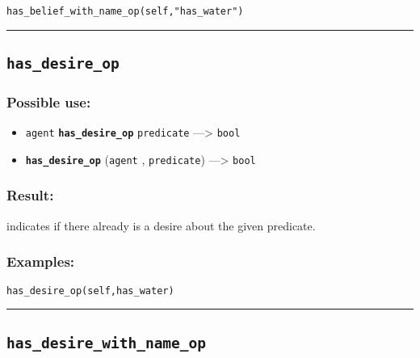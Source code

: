\documentclass[]{book}
\providecommand{\tightlist}{%
  \setlength{\itemsep}{0pt}\setlength{\parskip}{0pt}}
\theoremstyle{definition}
\theoremstyle{definition}
\theoremstyle{definition}
\theoremstyle{remark}
\begin{document}
\begin{verbatim}
has_belief_with_name_op(self,"has_water") 
\end{verbatim}

\begin{center}\rule{0.5\linewidth}{\linethickness}\end{center}

\subsection{\texorpdfstring{\texttt{has\_desire\_op}}{has\_desire\_op}}\label{has_desire_op}

\subsubsection{Possible use:}\label{possible-use-248}

\begin{itemize}
\tightlist
\item
  \texttt{agent} \textbf{\texttt{has\_desire\_op}} \texttt{predicate}
  ---\textgreater{} \texttt{bool}
\item
  \textbf{\texttt{has\_desire\_op}} (\texttt{agent} ,
  \texttt{predicate}) ---\textgreater{} \texttt{bool}
\end{itemize}

\subsubsection{Result:}\label{result-239}

indicates if there already is a desire about the given predicate.

\subsubsection{Examples:}\label{examples-188}

\begin{verbatim}
has_desire_op(self,has_water) 
\end{verbatim}

\begin{center}\rule{0.5\linewidth}{\linethickness}\end{center}

\subsection{\texorpdfstring{\texttt{has\_desire\_with\_name\_op}}{has\_desire\_with\_name\_op}}\label{has_desire_with_name_op}
\end{document}
